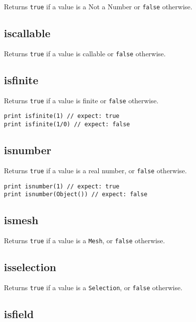 Returns \texttt{true} if a value is a Not a Number or \texttt{false}
otherwise.

\hypertarget{iscallable}{%
\subsection{iscallable}\label{iscallable}}

Returns \texttt{true} if a value is callable or \texttt{false}
otherwise.

\hypertarget{isfinite}{%
\subsection{isfinite}\label{isfinite}}

Returns \texttt{true} if a value is finite or \texttt{false} otherwise.

\begin{lstlisting}
print isfinite(1) // expect: true 
print isfinite(1/0) // expect: false 
\end{lstlisting}

\hypertarget{isnumber}{%
\subsection{isnumber}\label{isnumber}}

Returns \texttt{true} if a value is a real number, or \texttt{false}
otherwise.

\begin{lstlisting}
print isnumber(1) // expect: true 
print isnumber(Object()) // expect: false
\end{lstlisting}

\hypertarget{ismesh}{%
\subsection{ismesh}\label{ismesh}}

Returns \texttt{true} if a value is a \texttt{Mesh}, or \texttt{false}
otherwise.

\hypertarget{isselection}{%
\subsection{isselection}\label{isselection}}

Returns \texttt{true} if a value is a \texttt{Selection}, or
\texttt{false} otherwise.

\hypertarget{isfield}{%
\subsection{isfield}\label{isfield}}

